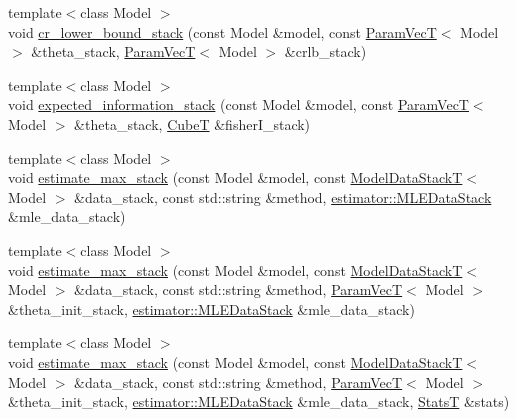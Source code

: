 \begin{DoxyCompactItemize}
{\footnotesize template$<$class Model $>$ }\\void \hyperlink{namespacemappel_1_1methods_1_1openmp_aba5970f5df4416a3d26c3ca5a86b8da5}{cr\+\_\+lower\+\_\+bound\+\_\+stack} (const Model \&model, const \hyperlink{namespacemappel_a0f86d3153e4e27b095012f140eea58de}{Param\+VecT}$<$ Model $>$ \&theta\+\_\+stack, \hyperlink{namespacemappel_a0f86d3153e4e27b095012f140eea58de}{Param\+VecT}$<$ Model $>$ \&crlb\+\_\+stack)
\item 
{\footnotesize template$<$class Model $>$ }\\void \hyperlink{namespacemappel_1_1methods_1_1openmp_ad58ad93952714ee5b5d7701cdf6032a8}{expected\+\_\+information\+\_\+stack} (const Model \&model, const \hyperlink{namespacemappel_a0f86d3153e4e27b095012f140eea58de}{Param\+VecT}$<$ Model $>$ \&theta\+\_\+stack, \hyperlink{namespacemappel_ab2afab4e6c8805e83946670d882768c2}{CubeT} \&fisher\+I\+\_\+stack)
\item 
{\footnotesize template$<$class Model $>$ }\\void \hyperlink{namespacemappel_1_1methods_1_1openmp_a2bbaebf7c6b7b0ed3ee4f0f7402ffc4f}{estimate\+\_\+max\+\_\+stack} (const Model \&model, const \hyperlink{namespacemappel_aaeb6665bc57476dd93c2df6ad8bc4768}{Model\+Data\+StackT}$<$ Model $>$ \&data\+\_\+stack, const std\+::string \&method, \hyperlink{namespacemappel_1_1estimator_structmappel_1_1estimator_1_1MLEDataStack}{estimator\+::\+M\+L\+E\+Data\+Stack} \&mle\+\_\+data\+\_\+stack)
\item 
{\footnotesize template$<$class Model $>$ }\\void \hyperlink{namespacemappel_1_1methods_1_1openmp_a70dc7b79d0b63bb604e670a7cd075c56}{estimate\+\_\+max\+\_\+stack} (const Model \&model, const \hyperlink{namespacemappel_aaeb6665bc57476dd93c2df6ad8bc4768}{Model\+Data\+StackT}$<$ Model $>$ \&data\+\_\+stack, const std\+::string \&method, \hyperlink{namespacemappel_a0f86d3153e4e27b095012f140eea58de}{Param\+VecT}$<$ Model $>$ \&theta\+\_\+init\+\_\+stack, \hyperlink{namespacemappel_1_1estimator_structmappel_1_1estimator_1_1MLEDataStack}{estimator\+::\+M\+L\+E\+Data\+Stack} \&mle\+\_\+data\+\_\+stack)
\item 
{\footnotesize template$<$class Model $>$ }\\void \hyperlink{namespacemappel_1_1methods_1_1openmp_a8e3af28b0599091dbcc1ee882ea36498}{estimate\+\_\+max\+\_\+stack} (const Model \&model, const \hyperlink{namespacemappel_aaeb6665bc57476dd93c2df6ad8bc4768}{Model\+Data\+StackT}$<$ Model $>$ \&data\+\_\+stack, const std\+::string \&method, \hyperlink{namespacemappel_a0f86d3153e4e27b095012f140eea58de}{Param\+VecT}$<$ Model $>$ \&theta\+\_\+init\+\_\+stack, \hyperlink{namespacemappel_1_1estimator_structmappel_1_1estimator_1_1MLEDataStack}{estimator\+::\+M\+L\+E\+Data\+Stack} \&mle\+\_\+data\+\_\+stack, \hyperlink{namespacemappel_a04ab395b0cf82c4ce68a36b2212649a5}{StatsT} \&stats)

\end{DoxyCompactItemize}
